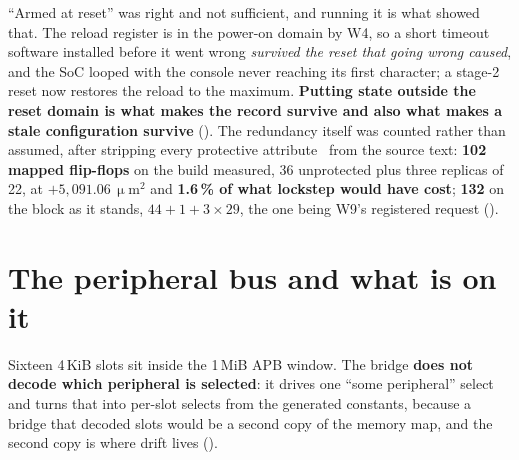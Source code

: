 ``Armed at reset'' was right and not sufficient, and running it is what
showed that. The reload register is in the power-on domain by W4, so a
short timeout software installed before it went wrong \emph{survived the
reset that going wrong caused}, and the SoC looped with the console never reaching its first character; a
stage-2 reset now restores the reload to the maximum. \textbf{Putting
state outside the reset domain is what makes the record survive and also
what makes a stale configuration survive} (). The
redundancy itself was counted rather than assumed, after stripping every
protective attribute~\cite{esa_ftmr} from the source text: \textbf{102 mapped
flip-flops} on the build  measured, 36 unprotected plus three
replicas of 22, at $+5{,}091.06\,\upmu$m$^2$ and \textbf{1.6\,\% of what
lockstep would have cost}; \textbf{132} on the block as it stands,
$44 + 1 + 3 \times 29$, the one being W9's registered request
().

\section{The peripheral bus and what is on it}

Sixteen 4\,KiB slots sit inside the 1\,MiB APB window. The bridge
\textbf{does not decode which peripheral is selected}: it drives one ``some peripheral'' select and
 turns that into per-slot selects from the generated
constants, because a bridge that decoded slots would be a second copy of
the memory map, and the second copy is where drift lives
().

